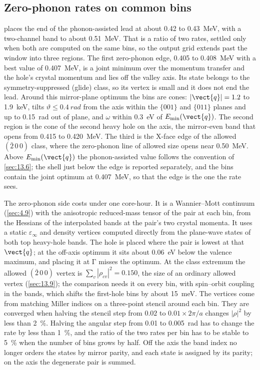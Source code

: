 \subsection{Zero-phonon rates on common bins}

 places the end of the phonon-assisted lead at about 0.42 to \SI{0.43}{MeV}, with a two-channel band to about \SI{0.51}{MeV}. That is a ratio of two rates, settled only when both are computed on the same bins, so the output grid extends past the window into three regions. The first zero-phonon edge, 0.405 to \SI{0.408}{MeV} with a best value of \SI{0.407}{MeV}, is a joint minimum over the momentum transfer and the hole's crystal momentum and lies off the valley axis. Its state belongs to the symmetry-suppressed (glide) class, so its vertex is small and it does not end the lead. Around this mirror-plane optimum the bins are cones: $|\vect{q}| = 1.2$ to \SI{1.9}{keV}, tilts $\vartheta \le \SI{0.4}{rad}$ from the axis within the $\{001\}$ and $\{011\}$ planes and up to \SI{0.15}{rad} out of plane, and $\omega$ within \SI{0.3}{eV} of $E_{\mathrm{min}}(\vect{q})$. The second region is the cone of the second heavy hole on the axis, the mirror-even band that opens from 0.415 to \SI{0.420}{MeV}. The third is the X-face edge of the allowed $(\bar2\,0\,0)$ class, where the zero-phonon line of allowed size opens near \SI{0.50}{MeV}. Above $E_{\mathrm{min}}(\vect{q})$ the phonon-assisted value follows the convention of \cref{sec:13.6}; the shell just below the edge is reported separately, and the bins contain the joint optimum at \SI{0.407}{MeV}, so that the edge is the one the rate sees.

The zero-phonon side costs under one core-hour. It is a Wannier--Mott continuum (\cref{sec:4.9}) with the anisotropic reduced-mass tensor of the pair at each bin, from the Hessians of the interpolated bands at the pair's two crystal momenta. It uses a static $\varepsilon_\infty$ and density vertices computed directly from the plane-wave states of both top heavy-hole bands. The hole is placed where the pair is lowest at that $\vect{q}$; at the off-axis optimum it sits about \SI{0.06}{eV} below the valence maximum, and placing it at $\mathrm{\Gamma}$ misses the optimum. At the class extremum the allowed $(\bar2\,0\,0)$ vertex is $\sum_v|\rho_{cv}|^2 = 0.150$, the size of an ordinary allowed vertex (\cref{sec:13.9}); the comparison needs it on every bin, with spin--orbit coupling in the bands, which shifts the first-hole bins by about \SI{15}{meV}. The vertices come from matching Miller indices on a three-point stencil around each bin. They are converged when halving the stencil step from $0.02$ to $0.01\times2\pi/a$ changes $|\rho|^2$ by less than \SI{2}{\percent}. Halving the angular step from 0.01 to \SI{0.005}{rad} has to change the rate by less than \SI{1}{\percent}, and the ratio of the two rates per bin has to be stable to \SI{5}{\percent} when the number of bins grows by half. Off the axis the band index no longer orders the states by mirror parity, and each state is assigned by its parity; on the axis the degenerate pair is summed.

